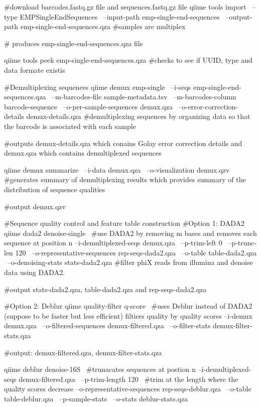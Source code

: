 #download barcodes.fastq.gz file and sequences.fastq.gz file
qiime tools import \
  --type EMPSingleEndSequences \
  --input-path emp-single-end-sequences \
  --output-path emp-single-end-sequences.qza #samples are multiplex
  
  # produces emp-single-end-sequences.qza file
  
  qiime tools peek emp-single-end-sequences.qza #checks to see if UUID, type and data formate existis
  
  #Demultiplexing sequences
  qiime demux emp-single \
  --i-seqs emp-single-end-sequences.qza \
  --m-barcodes-file sample-metadata.tsv \
  --m-barcodes-column barcode-sequence \
  --o-per-sample-sequences demux.qza \
  --o-error-correction-details demux-details.qza #demultiplexing sequences by organizing data so that the barcode is associated with each sample
  
  #outputs demux-details.qza which conains Golay error correction details and demux.qza which contains demultiplexed sequences
  
  qiime demux summarize \
  --i-data demux.qza \
  --o-visualization demux.qzv #generates summary of demultiplexing results which provides summary of the distribution of sequence qualities
  
  #output demux.qzv
  
  #Sequence quality control and feature table construction
  #Option 1: DADA2
  qiime dada2 denoise-single \ #use DADA2 by removing m bases and removes each sequence at position n
  --i-demultiplexed-seqs demux.qza \
  --p-trim-left 0 \
  --p-trunc-len 120 \
  --o-representative-sequences rep-seqs-dada2.qza \
  --o-table table-dada2.qza \
  --o-denoising-stats stats-dada2.qza #filter phiX reads from illumina and denoise data using DADA2. 
  
  #output stats-dada2.qza,  table-dada2.qza and rep-seqs-dada2.qza
  
  #Option 2: Deblur
  qiime quality-filter q-score \ #uses Deblur instead of DADA2 (suppose to be faster but less efficient) filtiers quality by quality scores 
 --i-demux demux.qza \
 --o-filtered-sequences demux-filtered.qza \
 --o-filter-stats demux-filter-stats.qza
 
 #output: demux-filtered.qza, demux-filter-stats.qza
 
 qiime deblur denoise-16S \ #trunacates sequences at postion n
  --i-demultiplexed-seqs demux-filtered.qza \
  --p-trim-length 120 \ #trim at the length where the quality scores decrease
  --o-representative-sequences rep-seqs-deblur.qza \
  --o-table table-deblur.qza \
  --p-sample-stats \
  --o-stats deblur-stats.qza
  
